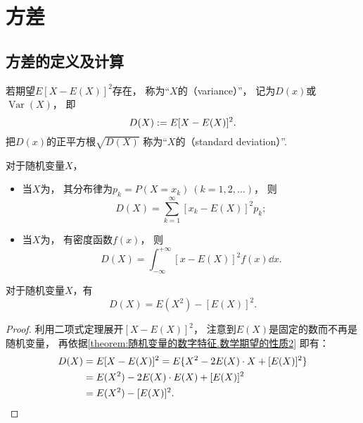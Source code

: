 \section{方差}
\subsection{方差的定义及计算}
\begin{definition}
若期望\(E[X-E(X)]^2\)存在，
称为“\(X\)的（variance）”，
记为\(D(x)\)或\(\operatorname{Var}(X)\)，
即\[
	D(X) := E[X-E(X)]^2.
\]
把\(D(x)\)的正平方根\(\sqrt{D(X)}\)
称为“\(X\)的（standard deviation）”.
\end{definition}

\begin{theorem}
对于随机变量\(X\)，
\begin{itemize}
	\item 当\(X\)为，
	其分布律为\(p_k = P(X=x_k)\ (k=1,2,\dotsc)\)，
	则\[
		D(X) = \sum_{k=1}^\infty [x_k - E(X)]^2 p_k;
	\]

	\item 当\(X\)为，
	有密度函数\(f(x)\)，
	则\[
		D(X) = \int_{-\infty}^{+\infty} [x - E(X)]^2 f(x) \dd{x}.
	\]
\end{itemize}
\end{theorem}

\begin{corollary}\label{theorem:随机变量的数字特征.常用的方差的计算式}
对于随机变量\(X\)，有\begin{equation}
	D(X) = E(X^2) - [E(X)]^2.
\end{equation}
\begin{proof}
利用二项式定理展开\([X-E(X)]^2\)，
注意到\(E(X)\)是固定的数而不再是随机变量，
再依据\cref{theorem:随机变量的数字特征.数学期望的性质2} 即有：
\begin{align*}
	D(X) &= E[X-E(X)]^2
	= E\{X^2 - 2E(X) \cdot X + [E(X)]^2\} \\
	&= E(X^2) - 2E(X) \cdot E(X) + [E(X)]^2 \\
	&= E(X^2) - [E(X)]^2.
	\qedhere
\end{align*}
\end{proof}
\end{corollary}

